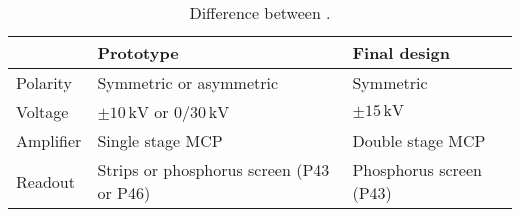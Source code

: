 \begin{table}[!h]
  \centering
  \caption[]{Difference between .}
  \label{chap5:tab:recap}
  \begin{tabularx}{\linewidth}{lXX}
    \toprule
              & Prototype                                    & Final design           \\
    \midrule
    Polarity  & Symmetric or asymmetric                      & Symmetric              \\
    Voltage   & $\pm 10\,\mathrm{kV}$ or $0/30\,\mathrm{kV}$ & $\pm 15\,\mathrm{kV}$  \\
    Amplifier & Single stage MCP                             & Double stage MCP       \\
    Readout   & Strips or phosphorus screen (P43 or P46)     & Phosphorus screen (P43) \\
    \bottomrule
  \end{tabularx}
\end{table}